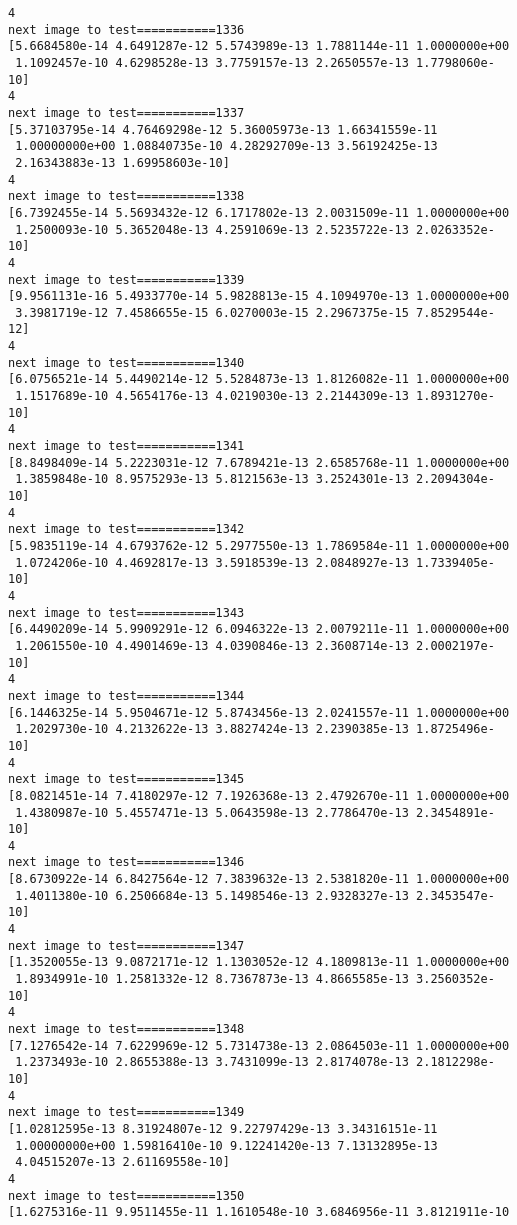 \documentclass[11pt]{article}
\begin{document}
\begin{Verbatim}[commandchars=\\\{\}]
4
next image to test===========1336
[5.6684580e-14 4.6491287e-12 5.5743989e-13 1.7881144e-11 1.0000000e+00
 1.1092457e-10 4.6298528e-13 3.7759157e-13 2.2650557e-13 1.7798060e-10]
4
next image to test===========1337
[5.37103795e-14 4.76469298e-12 5.36005973e-13 1.66341559e-11
 1.00000000e+00 1.08840735e-10 4.28292709e-13 3.56192425e-13
 2.16343883e-13 1.69958603e-10]
4
next image to test===========1338
[6.7392455e-14 5.5693432e-12 6.1717802e-13 2.0031509e-11 1.0000000e+00
 1.2500093e-10 5.3652048e-13 4.2591069e-13 2.5235722e-13 2.0263352e-10]
4
next image to test===========1339
[9.9561131e-16 5.4933770e-14 5.9828813e-15 4.1094970e-13 1.0000000e+00
 3.3981719e-12 7.4586655e-15 6.0270003e-15 2.2967375e-15 7.8529544e-12]
4
next image to test===========1340
[6.0756521e-14 5.4490214e-12 5.5284873e-13 1.8126082e-11 1.0000000e+00
 1.1517689e-10 4.5654176e-13 4.0219030e-13 2.2144309e-13 1.8931270e-10]
4
next image to test===========1341
[8.8498409e-14 5.2223031e-12 7.6789421e-13 2.6585768e-11 1.0000000e+00
 1.3859848e-10 8.9575293e-13 5.8121563e-13 3.2524301e-13 2.2094304e-10]
4
next image to test===========1342
[5.9835119e-14 4.6793762e-12 5.2977550e-13 1.7869584e-11 1.0000000e+00
 1.0724206e-10 4.4692817e-13 3.5918539e-13 2.0848927e-13 1.7339405e-10]
4
next image to test===========1343
[6.4490209e-14 5.9909291e-12 6.0946322e-13 2.0079211e-11 1.0000000e+00
 1.2061550e-10 4.4901469e-13 4.0390846e-13 2.3608714e-13 2.0002197e-10]
4
next image to test===========1344
[6.1446325e-14 5.9504671e-12 5.8743456e-13 2.0241557e-11 1.0000000e+00
 1.2029730e-10 4.2132622e-13 3.8827424e-13 2.2390385e-13 1.8725496e-10]
4
next image to test===========1345
[8.0821451e-14 7.4180297e-12 7.1926368e-13 2.4792670e-11 1.0000000e+00
 1.4380987e-10 5.4557471e-13 5.0643598e-13 2.7786470e-13 2.3454891e-10]
4
next image to test===========1346
[8.6730922e-14 6.8427564e-12 7.3839632e-13 2.5381820e-11 1.0000000e+00
 1.4011380e-10 6.2506684e-13 5.1498546e-13 2.9328327e-13 2.3453547e-10]
4
next image to test===========1347
[1.3520055e-13 9.0872171e-12 1.1303052e-12 4.1809813e-11 1.0000000e+00
 1.8934991e-10 1.2581332e-12 8.7367873e-13 4.8665585e-13 3.2560352e-10]
4
next image to test===========1348
[7.1276542e-14 7.6229969e-12 5.7314738e-13 2.0864503e-11 1.0000000e+00
 1.2373493e-10 2.8655388e-13 3.7431099e-13 2.8174078e-13 2.1812298e-10]
4
next image to test===========1349
[1.02812595e-13 8.31924807e-12 9.22797429e-13 3.34316151e-11
 1.00000000e+00 1.59816410e-10 9.12241420e-13 7.13132895e-13
 4.04515207e-13 2.61169558e-10]
4
next image to test===========1350
[1.6275316e-11 9.9511455e-11 1.1610548e-10 3.6846956e-11 3.8121911e-10

\end{Verbatim}
\end{document}
